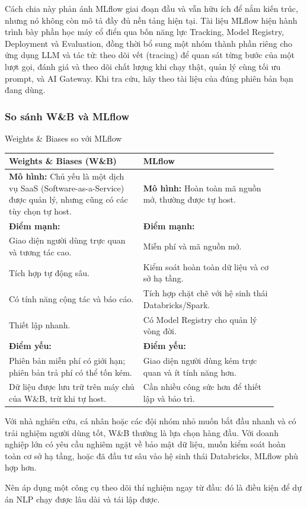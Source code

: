 Cách chia này phản ánh MLflow giai đoạn đầu và vẫn hữu ích để nắm kiến trúc, nhưng nó không còn mô tả đầy đủ nền tảng hiện tại. Tài liệu MLflow hiện hành trình bày phần học máy cổ điển qua bốn năng lực Tracking, Model Registry, Deployment và Evaluation, đồng thời bổ sung một nhóm thành phần riêng cho ứng dụng LLM và tác tử: theo dõi vết (tracing) để quan sát từng bước của một lượt gọi, đánh giá và theo dõi chất lượng khi chạy thật, quản lý cùng tối ưu prompt, và AI Gateway. Khi tra cứu, hãy theo tài liệu của đúng phiên bản bạn đang dùng.

\subsubsection{So sánh W\&B và MLflow}
\begin{assess}{Weights \& Biases so với MLflow}
\begin{tabular}{p{0.45\linewidth} | p{0.45\linewidth}}
    \textbf{Weights \& Biases (W\&B)} & \textbf{MLflow} \\
    \hline
    \textbf{Mô hình:} Chủ yếu là một dịch vụ SaaS (Software-as-a-Service) được quản lý, nhưng cũng có các tùy chọn tự host. & \textbf{Mô hình:} Hoàn toàn mã nguồn mở, thường được tự host. \\
    \hline
    \textbf{Điểm mạnh:} & \textbf{Điểm mạnh:} \\
    Giao diện người dùng trực quan và tương tác cao. & Miễn phí và mã nguồn mở. \\
    Tích hợp tự động sâu. & Kiểm soát hoàn toàn dữ liệu và cơ sở hạ tầng. \\
    Có tính năng cộng tác và báo cáo. & Tích hợp chặt chẽ với hệ sinh thái Databricks/Spark. \\
    Thiết lập nhanh. & Có Model Registry cho quản lý vòng đời. \\
    \hline
    \textbf{Điểm yếu:} & \textbf{Điểm yếu:} \\
    Phiên bản miễn phí có giới hạn; phiên bản trả phí có thể tốn kém. & Giao diện người dùng kém trực quan và ít tính năng hơn. \\
    Dữ liệu được lưu trữ trên máy chủ của W\&B, trừ khi tự host. & Cần nhiều công sức hơn để thiết lập và bảo trì. \\
\end{tabular}
\end{assess}

Với nhà nghiên cứu, cá nhân hoặc các đội nhóm nhỏ muốn bắt đầu nhanh và có trải nghiệm người dùng tốt, W\&B thường là lựa chọn hàng đầu. Với doanh nghiệp lớn có yêu cầu nghiêm ngặt về bảo mật dữ liệu, muốn kiểm soát hoàn toàn cơ sở hạ tầng, hoặc đã đầu tư sâu vào hệ sinh thái Databricks, MLflow phù hợp hơn.

Nên áp dụng một công cụ theo dõi thí nghiệm ngay từ đầu: đó là điều kiện để dự án NLP chạy được lâu dài và tái lập được.